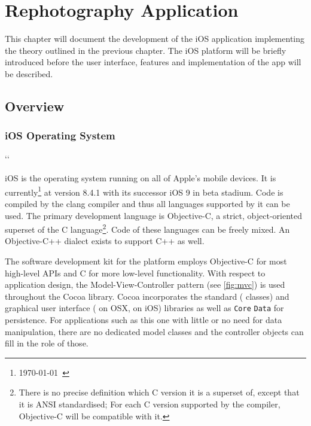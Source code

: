 \chapter{Rephotography Application}

This chapter will document the development of the iOS application implementing
the theory outlined in the previous chapter. The iOS platform will be briefly
introduced before the user interface, features and implementation of the app
will be described.

\section{Overview}


\subsection{iOS Operating System}

\newcommand*{\code}[1]{\begingroup\ttfamily\hyphenchar\font=23{#1}\endgroup}
\lccode`\:`\:

\setlength{\fboxsep}{0pt}
\newcommand*{\colorcode}[1]{\colorbox{gray!50}{\code{#1}\hspace{-6pt}}} %

iOS is the operating system running on all of Apple's mobile devices. It is
currently\footnote{\today\ \citep{ios8}} at version 8.4.1 with its successor iOS
9 in beta stadium. Code is compiled by the clang compiler and thus all
languages supported by it can be used. The primary development
language is Objective-C, a strict, object-oriented superset of the C language\footnote{There is
   no precise definition which C version it is a superset of, except that it is
   ANSI standardised; For each C version supported by the compiler, Objective-C
will be compatible with it.}. Code of these languages can be freely mixed. An
Objective-C++ dialect exists to support C++ as well.

The software development kit for the platform employs Objective-C for most
high-level APIs and C for more low-level functionality. With respect to
application design, the Model-View-Controller pattern (see \autoref{fig:mvc}) is
used throughout the Cocoa library. Cocoa incorporates the standard
(\code{Foundation} classes) and graphical user interface (\code{AppKit} on OSX,
\code{UIKit} on iOS) libraries as well as \texttt{Core} \texttt{Data} for
persistence. For applications such as this one with little or no need for data manipulation,
there are no dedicated model classes and the controller objects can fill in the
role of those.  

